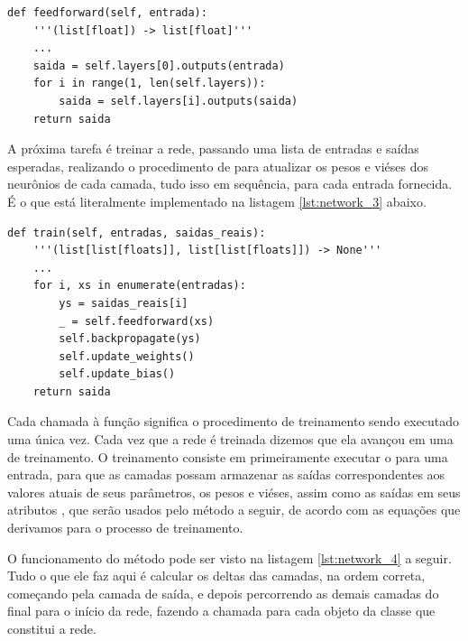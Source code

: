 \begin{scriptsize}
\estiloR
\begin{lstlisting}[caption={Trecho da classe \eng{Network}}, label={lst:network_2}, escapeinside={\%}]
def feedforward(self, entrada):
    '''(list[float]) -> list[float]'''
    ...
    saida = self.layers[0].outputs(entrada)
    for i in range(1, len(self.layers)):
        saida = self.layers[i].outputs(saida)
    return saida
\end{lstlisting}
\end{scriptsize}

A próxima tarefa é treinar a rede, passando uma lista de entradas e saídas esperadas, realizando o procedimento de  para atualizar os pesos e viéses dos neurônios de cada camada, tudo isso em sequência, para cada entrada fornecida. É o que está literalmente implementado na listagem \ref{lst:network_3} abaixo.

\begin{scriptsize}
\estiloR
\begin{lstlisting}[caption={Trecho da classe \eng{Network}}, label={lst:network_3}, escapeinside={\%}]
def train(self, entradas, saidas_reais):
    '''(list[list[floats]], list[list[floats]]) -> None'''
    ...
    for i, xs in enumerate(entradas):
        ys = saidas_reais[i]
        _ = self.feedforward(xs)
        self.backpropagate(ys)
        self.update_weights()
        self.update_bias()
	return saida
\end{lstlisting}
\end{scriptsize}

Cada chamada à função  significa o procedimento de treinamento sendo executado uma única vez. Cada vez que a rede é treinada dizemos que ela avançou em uma  de treinamento. O treinamento consiste em primeiramente executar o  para uma entrada, para que as camadas possam armazenar as saídas correspondentes aos valores atuais de seus parâmetros, os pesos e viéses, assim como as saídas em seus atributos , que serão usados pelo método  a seguir, de acordo com as equações que derivamos para o processo de treinamento.

O funcionamento do método  pode ser visto na listagem \ref{lst:network_4} a seguir. Tudo o que ele faz aqui é calcular os deltas das camadas, na ordem correta, começando pela camada de saída, e depois percorrendo as demais camadas do final para o início da rede, fazendo a chamada para cada objeto da classe  que constitui a rede.

